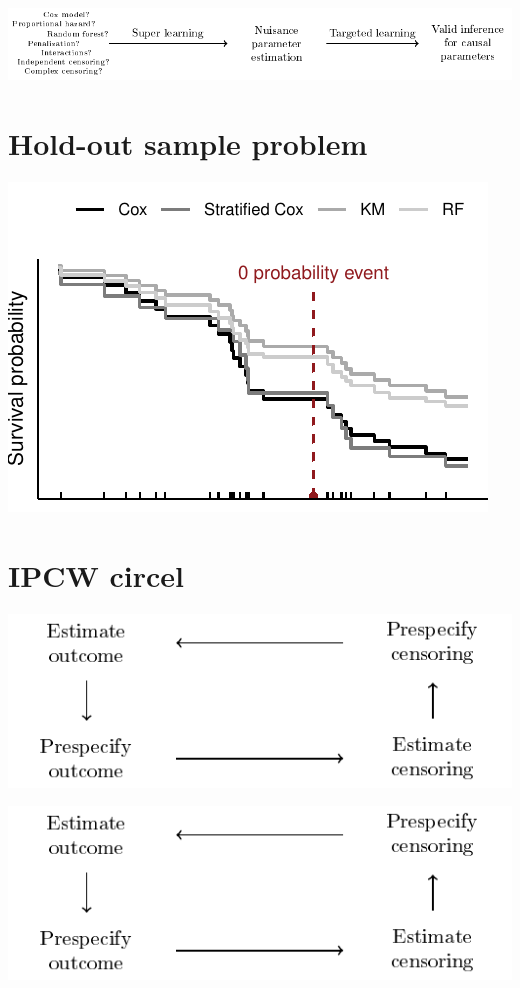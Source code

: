 \documentclass[11pt]{article}
\begin{document}
\begin{center}
\includegraphics[width=.9\linewidth]{motivation.pdf}
\end{center}

\section{Hold-out sample problem}
\label{sec:orgeb1f1f9}
\begin{center}
\includegraphics[width=.9\linewidth]{sl-hold-out-sample.pdf}
\end{center}



\section{IPCW circel}
\label{sec:org05a74bf}

\begin{center}
\includegraphics[width=.9\linewidth]{ipcw-circle.pdf}
\end{center}

\begin{center}
\includegraphics[width=.9\linewidth]{ipcw-circle.pdf}
\end{center}
\end{document}
